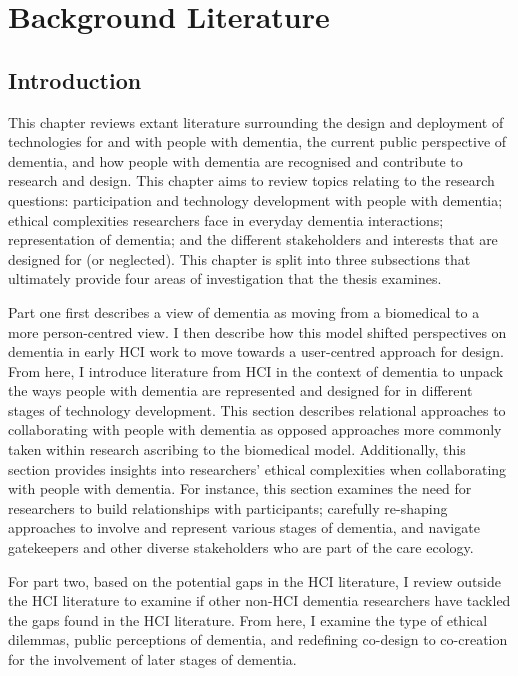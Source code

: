 \chapter{Background Literature}
\label{BackgroundLit}

\section{Introduction}
\label{BL:Intro}
This chapter reviews extant literature surrounding the design and deployment of technologies for and with people with dementia, the current public perspective of dementia, and how people with dementia are recognised and contribute to research and design. This chapter aims to review topics relating to the research questions: participation and technology development with people with dementia; ethical complexities researchers face in everyday dementia interactions; representation of dementia; and the different stakeholders and interests that are designed for (or neglected). This chapter is split into three subsections that ultimately provide four areas of investigation that the thesis examines.

Part one first describes a view of dementia as moving from a biomedical to a more person-centred view. I then describe how this model shifted perspectives on dementia in early HCI work to move towards a user-centred approach for design. From here, I introduce literature from HCI in the context of dementia to unpack the ways people with dementia are represented and designed for in different stages of technology development. This section describes relational approaches to collaborating with people with dementia as opposed approaches more commonly taken within research ascribing to the biomedical model. Additionally, this section provides insights into researchers' ethical complexities when collaborating with people with dementia. For instance, this section examines the need for researchers to build relationships with participants; carefully re-shaping approaches to involve and represent various stages of dementia, and navigate gatekeepers and other diverse stakeholders who are part of the care ecology.

For part two, based on the potential gaps in the HCI literature, I review outside the HCI literature to examine if other non-HCI dementia researchers have tackled the gaps found in the HCI literature. From here, I examine the type of ethical dilemmas, public perceptions of dementia, and redefining co-design to co-creation for the involvement of later stages of dementia.

